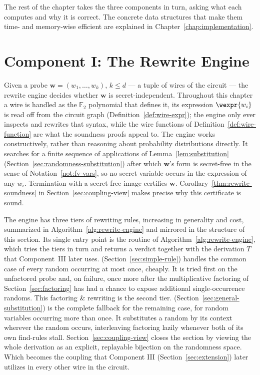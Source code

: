 The rest of the chapter takes the three components in turn, asking
what each computes and why it is correct. The concrete
data structures that make them time- and memory-wise efficient are explained in
Chapter~\ref{chap:implementation}.

\section{Component I: The Rewrite Engine}
\label{sec:rewrite-engine}
Given a probe $\mathbf{w} = (w_1, \dots, w_k)$, $k \le d$ --- a tuple of
wires of the circuit --- the rewrite engine decides whether $\mathbf{w}$ is
secret-independent. Throughout this chapter a wire is handled as the
$\mathbb{F}_2$ polynomial that defines it, its expression $\wexpr{w_i}$ is read off from
the circuit graph (Definition~\ref{def:wire-expr}); the engine only ever inspects
and rewrites that syntax, while the wire functions of
Definition~\ref{def:wire-function} are what the soundness proofs appeal to. The engine
works constructively, rather than reasoning about
probability distributions directly. It searches for a finite sequence of
applications of Lemma~\ref{lem:substitution}
(Section~\ref{sec:randomness-substitution}) after which $\mathbf{w}$'s form is
secret-free in the sense of Notation~\ref{not:fv-vars}, so no secret variable
occurs in the expression of any $w_i$. Termination with a secret-free image
certifies $\mathbf{w}$.
Corollary~\ref{thm:rewrite-soundness} in Section~\ref{sec:coupling-view} makes precise
why this certificate is sound.

The engine has three tiers of rewriting rules, increasing in generality and cost,
summarized in
Algorithm~\ref{alg:rewrite-engine} and mirrored in the structure of this section.
Its single entry point is the routine  of
Algorithm~\ref{alg:rewrite-engine}, which tries the tiers in turn and returns a
verdict together with the derivation $T$ that Component~III later uses.
 (Section~\ref{sec:simple-rule}) handles the common case of
every random occurring at most once, cheaply. It is tried first on the unfactored
probe and, on failure, once more after the multiplicative factoring of
Section~\ref{sec:factoring} has had a chance to expose additional single-occurrence
randoms. This factoring \& rewriting is the second tier.
 (Section~\ref{sec:general-substitution}) is the
complete fallback for the remaining case, for random variables occurring more than once. It
substitutes a random by its context wherever the random occurs, interleaving
factoring lazily whenever both of its own find-rules stall. Section~\ref{sec:coupling-view}
closes the section by viewing the whole derivation as an explicit, replayable
bijection on the randomness space. Which becomes the \gls{coupling} that Component III
(Section~\ref{sec:extension}) later utilizes in every other wire in the circuit.

